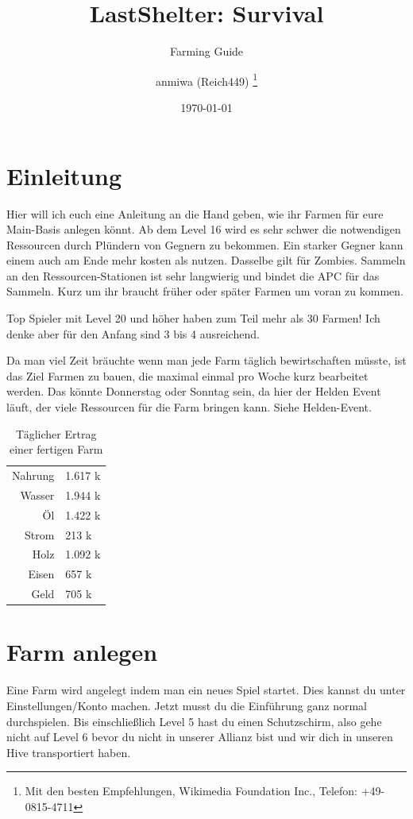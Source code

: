 \documentclass[fontsize=12pt,a4paper,draft]{scrartcl}[2003/01/01]
\title{LastShelter: Survival}
\subtitle{Farming Guide}
\author{\textcopyleft{} anmiwa (Reich449)%
  \thanks{Mit den besten Empfehlungen,
    Wikimedia Foundation Inc.,
    Telefon: +49-0815-4711}}
\date{\today}               %
\begin{document}
\maketitle                  %
\tableofcontents            %

\listoffigures

\section{Einleitung}
Hier will ich euch eine Anleitung an die Hand geben, wie ihr Farmen für eure Main-Basis anlegen könnt. Ab dem Level 16 wird es sehr schwer die notwendigen Ressourcen durch Plündern von Gegnern zu bekommen. Ein starker Gegner kann einem auch am Ende mehr kosten als nutzen.
Dasselbe gilt für Zombies. Sammeln an den Ressourcen-Stationen ist sehr langwierig und bindet die APC für das Sammeln. Kurz um ihr braucht früher oder später Farmen um voran zu kommen.

Top Spieler mit Level 20 und höher haben zum Teil mehr als 30 Farmen! Ich denke aber für den Anfang sind 3 bis 4 ausreichend.

Da man viel Zeit bräuchte wenn man jede Farm täglich bewirtschaften müsste, ist das Ziel Farmen zu bauen, die maximal einmal pro Woche kurz bearbeitet werden. Das könnte Donnerstag oder Sonntag sein, da hier der Helden Event läuft, der viele Ressourcen für die Farm bringen kann. Siehe Helden-Event.

\begin{table}[h!]
  \centering
    \caption[Ertrag]{Täglicher Ertrag einer fertigen Farm}
    \begin{tabular}{rl}
      Nahrung & 1.617 k \\
      Wasser & 1.944 k \\
      Öl & 1.422 k \\
      Strom & 213 k \\
      Holz & 1.092 k \\
      Eisen & 657 k \\
      Geld & 705 k \\
    \end{tabular}
\end{table}

\section{Farm anlegen}
Eine Farm wird angelegt indem man ein neues Spiel startet. Dies kannst du unter Einstellungen/Konto machen.
Jetzt musst du die Einführung ganz normal durchspielen. Bis einschließlich Level 5 hast du einen Schutzschirm,
also gehe nicht auf Level 6 bevor du nicht in unserer Allianz bist und wir dich in unseren Hive transportiert haben.
\end{document}
